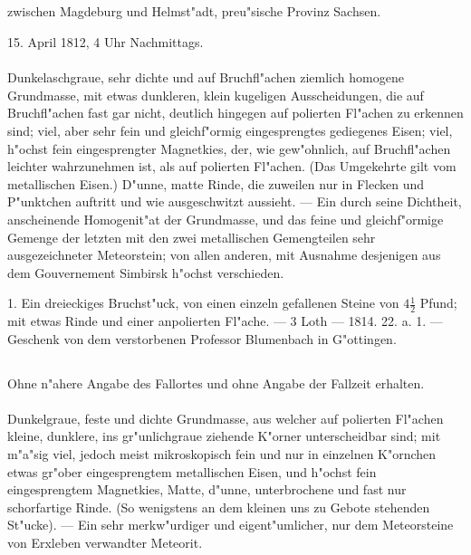 \documentclass[a4paper, 11pt, oneside, polutonikogreek, german]{article}
\begin{document}
\subsection[\frakfamily{Erxleben.}]{}
\begin{center}

zwischen Magdeburg und Helmst"adt, preu"sische Provinz Sachsen.

15. April 1812, 4 Uhr Nachmittags.
\end{center}
\paragraph{}
Dunkelaschgraue, sehr dichte und auf Bruchfl"achen ziemlich homogene Grundmasse, mit etwas dunkleren, klein kugeligen Ausscheidungen, die auf Bruchfl"achen fast gar nicht, deutlich hingegen auf polierten Fl"achen zu erkennen sind; viel, aber sehr fein und gleichf"ormig eingesprengtes gediegenes Eisen; viel, h"ochst fein eingesprengter Magnetkies, der, wie gew"ohnlich, auf Bruchfl"achen leichter wahrzunehmen ist, als auf polierten Fl"achen. (Das Umgekehrte gilt vom metallischen Eisen.) D"unne, matte Rinde, die zuweilen nur in Flecken und P"unktchen auftritt und wie ausgeschwitzt aussieht. --- Ein durch seine Dichtheit, anscheinende Homogenit"at der Grundmasse, und das feine und gleichf"ormige Gemenge der letzten mit den zwei metallischen Gemengteilen sehr ausgezeichneter Meteorstein; von allen anderen, mit Ausnahme desjenigen aus dem Gouvernement Simbirsk h"ochst verschieden.

1. Ein dreieckiges Bruchst"uck, von einen einzeln gefallenen Steine von $4\frac{1}{2}$ Pfund; mit etwas Rinde und einer anpolierten Fl"ache. --- 3 Loth --- 1814. 22. a. 1. --- Geschenk von dem verstorbenen Professor Blumenbach in G"ottingen.
\subsection{}
\begin{center}

Ohne n"ahere Angabe des Fallortes und ohne Angabe der Fallzeit erhalten.
\end{center}
\paragraph{}
Dunkelgraue, feste und dichte Grundmasse, aus welcher auf polierten Fl"achen kleine, dunklere, ins gr"unlichgraue ziehende K"orner unterscheidbar sind; mit m"a"sig viel, jedoch meist mikroskopisch fein und nur in einzelnen K"ornchen etwas gr"ober eingesprengtem metallischen Eisen, und h"ochst fein eingesprengtem Magnetkies, Matte, d"unne, unterbrochene und fast nur schorfartige Rinde. (So wenigstens an dem kleinen uns zu Gebote stehenden St"ucke). --- Ein sehr merkw"urdiger und eigent"umlicher, nur dem Meteorsteine von Erxleben verwandter Meteorit.
\end{document}
